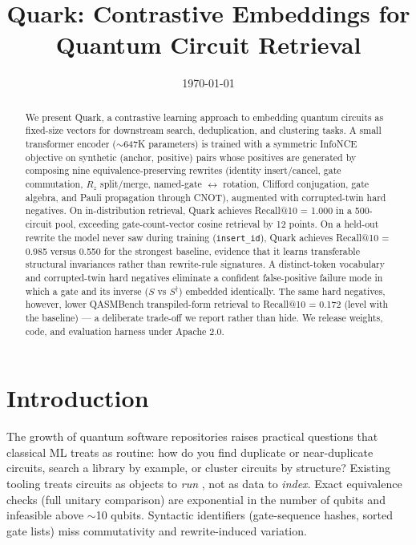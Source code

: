\documentclass[11pt]{article}
\title{Quark: Contrastive Embeddings for Quantum Circuit Retrieval}
\author{}
\date{\today}
\begin{document}
\maketitle

\begin{abstract}
We present Quark, a contrastive learning approach to embedding quantum circuits as fixed-size vectors for downstream search, deduplication, and clustering tasks. A small transformer encoder ($\sim$647K parameters) is trained with a symmetric InfoNCE objective on synthetic (anchor, positive) pairs whose positives are generated by composing nine equivalence-preserving rewrites (identity insert/cancel, gate commutation, $R_z$ split/merge, named-gate $\leftrightarrow$ rotation, Clifford conjugation, gate algebra, and Pauli propagation through CNOT), augmented with corrupted-twin hard negatives. On in-distribution retrieval, Quark achieves Recall@10 = 1.000 in a 500-circuit pool, exceeding gate-count-vector cosine retrieval by 12 points. On a held-out rewrite the model never saw during training (\texttt{insert\_id}), Quark achieves Recall@10 = 0.985 versus 0.550 for the strongest baseline, evidence that it learns transferable structural invariances rather than rewrite-rule signatures. A distinct-token vocabulary and corrupted-twin hard negatives eliminate a confident false-positive failure mode in which a gate and its inverse ($S$ vs $S^\dagger$) embedded identically. The same hard negatives, however, lower QASMBench transpiled-form retrieval to Recall@10 = 0.172 (level with the baseline) --- a deliberate trade-off we report rather than hide. We release weights, code, and evaluation harness under Apache 2.0.
\end{abstract}

\section{Introduction}

The growth of quantum software repositories raises practical questions that classical ML treats as routine: how do you find duplicate or near-duplicate circuits, search a library by example, or cluster circuits by structure? Existing tooling treats circuits as objects to \emph{run} \cite{qiskit, pennylane}, not as data to \emph{index}. Exact equivalence checks (full unitary comparison) are exponential in the number of qubits and infeasible above $\sim$10 qubits. Syntactic identifiers (gate-sequence hashes, sorted gate lists) miss commutativity and rewrite-induced variation.
\end{document}

